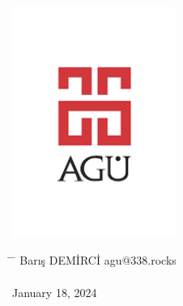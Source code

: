 \begin{center}
	\includegraphics[width=0.4\textwidth]{assets/agu.png}

	\Huge
	\textbf{\paperTitle}

	\vspace{0.3cm}
	\Huge
	\paperSubTitle{}

	\vspace{0.8cm}
	\large
	\vspace{0.5cm}
	\LARGE
	\vspace{1.5cm}
	\textbf{}
	\vfill
	\vspace{0.8cm}
	\Large
\end{center}

\begin{tabbing}
	\hspace*{1em}\= \hspace*{8em} \= \kill
	\> Barış DEMİRCİ \> agu@338.rocks \\
	\> \> \\
	\> January 18, 2024 \> \\
\end{tabbing}
